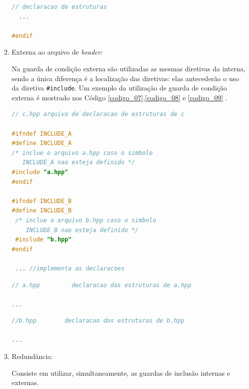 \begin{enumerate}
\begin{lstlisting}[language=C++,caption={
                        Arquivo a.hpp contendo guardas de inclusão interna},
                                                            label=codigo_06]
  // declaracao de estruturas 
  ...

#endif
\end{lstlisting}


\item Externa ao arquivo de \textit{header}:
 
Na  guarda de condição externa  são utilizadas as mesmas diretivas da interna,
 sendo a única diferença é a localização das diretivas: elas antecederão o uso
 da diretiva \texttt{\#include}. Um exemplo da utilização de guarda de condição 
externa é mostrado nos Código \ref{codigo_07},\ref{codigo_08} e
 \ref{codigo_09} \cite[pag.80]{ref42}.


\begin{lstlisting}[language=C++,caption={
					    Arquivo c.hpp contendo guardas de inclusão externa},
                                                            label=codigo_07]
// c.hpp arquivo de declaracao de estruturas de c

#ifndef INCLUDE_A
#define INCLUDE_A
/* inclue o arquivo a.hpp caso o simbolo 
   INCLUDE_A nao esteja definido */
#include "a.hpp"
#endif
        
#ifndef INCLUDE_B
#define INCLUDE_B
 /* inclue o arquivo b.hpp caso o simbolo 
    INCLUDE_B nao esteja definido */
 #include "b.hpp"
#endif

 ... //implementa as declaracoes

\end{lstlisting}

\begin{lstlisting}[language=C++,caption={
						   Arquivo a.hpp com guarda de inclusão externa},
                                                         label=codigo_08]
// a.hpp         declaracao das estruturas de a.hpp

...

\end{lstlisting}

\begin{lstlisting}[language=C++,caption={
					         Arquivo b.hpp com guarda de inclusão externa},
                                                           label=codigo_09]
//b.hpp        declaracao das estruturas de b.hpp

...

\end{lstlisting}


\item Redundância:\label{redundancia_melhor}

Consiste em utilizar, simultaneamente, as guardas de inclusão internas e 
externas. 


\end{enumerate}
